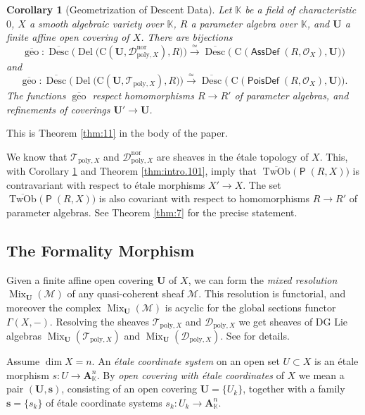 \documentclass[a4paper, 10pt]{amsart}
\newtheorem{cor}[equation]{Corollary}
\theoremstyle{definition}
\numberwithin{equation}{section}
\newcommand{\iso}{\xrightarrow{\simeq}}
\newcommand{\opn}{\operatorname}
\newcommand{\cat}[1]{\operatorname{\mathsf{#1}}}
\newcommand{\ol}{\overline}
\newcommand{\mcal}[1]{\mathcal{#1}}
\newcommand{\mbf}[1]{\mathbf{#1}}
\newcommand{\mrm}[1]{\mathrm{#1}}
\newcommand{\mbb}[1]{\mathbb{#1}}
\newcommand{\bsym}[1]{\boldsymbol{#1}}
\newcommand{\K}{\mbb{K}}
\newcommand{\twocat}[1]{\operatorname{\bsym{\cat{#1}}}}
\begin{document}
\begin{cor}[Geometrization of Descent Data] \label{cor:110}
Let $\K$ be a field of characteristic $0$, $X$ a smooth algebraic variety
over $\K$, $R$ a parameter algebra over $\K$, 
and $\bsym{U}$ a finite affine open covering of $X$.
There are bijections
\[  \ol{\opn{geo}} : 
\ol{\opn{Desc}} \bigl( \opn{Del} \bigl(
\mrm{C}(\bsym{U}, \mcal{D}_{\mrm{poly}, X}^{\mrm{nor}}) , R 
\bigr) \bigr)
\iso
\ol{\opn{Desc}} \bigl( \opn{C} \bigl(
\twocat{AssDef}(R, \mcal{O}_X) , \bsym{U} \bigr) \bigr) \]
and 
\[  \ol{\opn{geo}} : 
\ol{\opn{Desc}} \bigl( \opn{Del} \bigl(
\mrm{C}(\bsym{U}, \mcal{T}_{\mrm{poly}, X}) , R 
\bigr) \bigr)
\iso
\ol{\opn{Desc}} \bigl( \opn{C} \bigl(
\twocat{PoisDef}(R, \mcal{O}_X) , \bsym{U} \bigr) \bigr) . \]
The functions $\ol{\opn{geo}}$ respect homomorphisms
$R \to R'$ of parameter algebras, and 
refinements of coverings $\bsym{U}' \to \bsym{U}$.
\end{cor}

This is Theorem \ref{thm:11} in the body of the paper.

We know that $\mcal{T}_{\mrm{poly}, X}$ and 
$\mcal{D}_{\mrm{poly}, X}^{\mrm{nor}}$ are sheaves in the \'etale topology of
$X$. This, with Corollary \ref{cor:110} and  Theorem \ref{thm:intro.101}, imply
that 
$\ol{\opn{TwOb}}  \bigl( \twocat{P}(R, X) \bigr)$
is contravariant with respect to \'etale morphisms $X' \to X$.
The set $\ol{\opn{TwOb}}  \bigl( \twocat{P}(R, X) \bigr)$
is also covariant with respect to homomorphisms $R \to R'$ of parameter
algebras. See Theorem \ref{thm:7} for the precise statement.


\subsection{The Formality Morphism}
Given a finite affine open covering $\bsym{U}$ of $X$,
we can form the {\em mixed resolution} 
$\opn{Mix}_{\bsym{U}}(\mcal{M})$ of any 
quasi-coherent sheaf $\mcal{M}$. This resolution is functorial, and moreover 
the complex $\opn{Mix}_{\bsym{U}}(\mcal{M})$ is acyclic for the global sections
functor $\Gamma(X, -)$. 
Resolving the sheaves $\mcal{T}_{\mrm{poly}, X}$ and 
$\mcal{D}_{\mrm{poly}, X}$ we get sheaves of  DG Lie algebras 
$\opn{Mix}_{\bsym{U}}(\mcal{T}_{\mrm{poly}, X})$ and
$\opn{Mix}_{\bsym{U}}(\mcal{D}_{\mrm{poly}, X})$. 
See \cite[Proposition 6.3]{Ye1} for details.

Assume $\opn{dim} X = n$. An {\em \'etale coordinate system} on an open set 
$U \subset X$ is an \'etale morphism $s : U \to \mbf{A}^n_{\K}$. 
By {\em open covering with \'etale coordinates} of $X$ we mean 
a pair $(\bsym{U}, \bsym{s})$, consisting of an open covering
$\bsym{U} = \{ U_k \}$, together with a family $\bsym{s} = \{ s_k \}$ of 
\'etale coordinate systems $s_k : U_k \to \mbf{A}^n_{\K}$.
\end{document}
